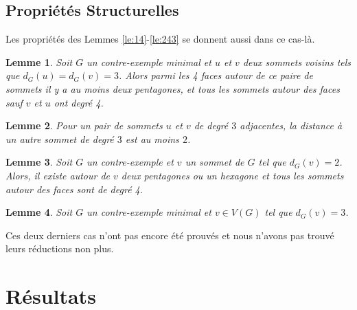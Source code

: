 \documentclass{beamer}
\newtheorem{lemme}{Lemme}
\begin{document}
\subsection{Propriétés Structurelles}
\begin{frame}
Les propriétés des Lemmes \ref{le:14}-\ref{le:243} se donnent aussi dans ce cas-là.
\end{frame}

\begin{frame}
\begin{lemme}
Soit $G$ un contre-exemple minimal et $u$ et $v$ deux sommets voisins tels que $d_G(u)=d_G(v) = 3$. Alors parmi les 4 faces autour de ce paire de sommets il y a au moins deux pentagones, et tous les sommets autour des faces sauf $v$ et $u$ ont degré 4.
\label{le:33pent}
\end{lemme}
\end{frame}

\begin{frame}
\begin{lemme}
Pour un pair de sommets $u$ et $v$ de degré $3$ adjacentes, la distance à un autre sommet de degré $3$ est au moins $2$.
\label{de:3343}
\end{lemme}
\end{frame}

\begin{frame}
\begin{lemme}
Soit $G$ un contre-exemple et $v$ un sommet de $G$ tel que $d_G(v) = 2$. Alors, il existe autour de $v$ deux pentagones ou un hexagone et tous les sommets autour des faces sont de degré 4.
\label{le:2pent}
\end{lemme}
\end{frame}

\begin{frame}
\begin{lemme}
Soit $G$ un contre-exemple minimal et $v \in V(G)$ tel que $d_G(v) = 3$.
\label{le:3}
\end{lemme}
\end{frame}

\begin{frame}
Ces deux derniers cas n'ont pas encore été prouvés et nous n'avons pas trouvé leurs réductions non plus.
\end{frame}

\section{Résultats}
\begin{frame}

\end{frame}
\end{document}
